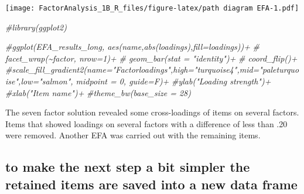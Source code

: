 \documentclass[
]{article}
\newenvironment{Shaded}{\begin{snugshade}}{\end{snugshade}}
\newcommand{\CommentTok}[1]{\textcolor[rgb]{0.56,0.35,0.01}{\textit{#1}}}
\begin{document}
\texttt{[image: FactorAnalysis\_1B\_R\_files/figure-latex/path diagram EFA-1.pdf]}

\begin{Shaded}
\begin{Highlighting}[]
\CommentTok{\#library(ggplot2)}

\CommentTok{\#ggplot(EFA\_results\_long, aes(name,abs(loadings),fill=loadings))+}
 \CommentTok{\#  facet\_wrap(\textasciitilde{}factor, nrow=1)+}
  \CommentTok{\# geom\_bar(stat = "identity")+}
  \CommentTok{\# coord\_flip()+}
  \CommentTok{\#scale\_fill\_gradient2(name="Factorloadings",high="turquoise4",mid="paleturquoise",low="salmon",    midpoint = 0, guide=F)+}
  \CommentTok{\#ylab("Loading strength")+}
  \CommentTok{\#xlab("Item name")+}
 \CommentTok{\#theme\_bw(base\_size = 28)}
\end{Highlighting}
\end{Shaded}

The seven factor solution revealed some cross-loadings of items on
several factors. Items that showed loadings on several factors with a
difference of less than .20 were removed. Another EFA was carried out
with the remaining items.

\hypertarget{to-make-the-next-step-a-bit-simpler-the-retained-items-are-saved-into-a-new-data-frame}{%
\subsection{to make the next step a bit simpler the retained items are
saved into a new data
frame}\label{to-make-the-next-step-a-bit-simpler-the-retained-items-are-saved-into-a-new-data-frame}}
\end{document}
